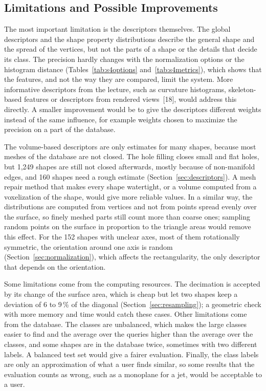 \documentclass[10pt,a4paper]{article}
\begin{document}
\subsection{Limitations and Possible Improvements}
The most important limitation is the descriptors themselves. The global descriptors and the shape property distributions
describe the general shape and the spread of the vertices, but not the parts of a shape or the details that decide its class.
The precision hardly changes with the normalization options or the histogram distance (Tables~\ref{tab:s4options}
and~\ref{tab:s4metrics}), which shows that the features, and not the way they are compared, limit the system. More informative
descriptors from the lecture, such as curvature histograms, skeleton-based features or descriptors from rendered views~[18],
would address this directly. A smaller improvement would be to give the descriptors different weights instead of the same
influence, for example weights chosen to maximize the precision on a part of the database.

The volume-based descriptors are only estimates for many shapes, because most meshes of the database are not closed. The hole
filling closes small and flat holes, but 1,249 shapes are still not closed afterwards, mostly because of non-manifold edges, and
160 shapes need a rough estimate (Section~\ref{sec:descriptors}).
A mesh repair method that makes every shape watertight, or a volume computed from a voxelization of the shape, would give more
reliable values. In a similar way, the distributions are computed from vertices and not from points spread evenly over the
surface, so finely meshed parts still count more than coarse ones; sampling random points on the surface in proportion to the
triangle areas would remove this effect. For the 152 shapes with unclear axes, most of them rotationally symmetric, the orientation around one axis is random
(Section~\ref{sec:normalization}), which affects the rectangularity, the only descriptor that depends on the orientation.

Some limitations come from the computing resources. The decimation is accepted by its change of the surface area, which is cheap
but let two shapes keep a deviation of 6 to 9\,\% of the diagonal (Section~\ref{sec:resampling}); a geometric check with more
memory and time would catch these cases. Other limitations come from the database. The classes are unbalanced, which makes the
large classes easier to find and the average over the queries higher than the average over the classes, and some shapes are in
the database twice, sometimes with two different labels. A balanced test set would give a fairer evaluation.
Finally, the class labels are only an approximation of what a user finds similar, so some results that the evaluation counts as
wrong, such as a monoplane for a jet, would be acceptable to a user.
\end{document}

